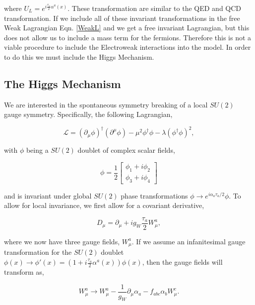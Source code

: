 where $U_L=e^{i\frac{\tau_a}{2}\alpha^a(x)}$. These transformation are similar to the QED and QCD transformation. If we include all of these invariant transformations in the free Weak Lagrangian Eqn. \ref{WeakL} and we get a free invariant Lagrangian, but this does not allow us to include a mass term for the fermions. Therefore this is not a viable procedure to include the Electroweak interactions into the model. In order to do this we must include the Higgs Mechanism.

\subsection{The Higgs Mechanism}\label{HiggsMechanism}

We are interested in the spontaneous symmetry breaking of a local $SU(2)$ gauge symmetry. Specifically, the following Lagrangian,

\begin{equation}\label{HiggsLagrangian}
\mathcal{L}=(\partial_\mu\phi)^\dagger(\partial^\mu\phi)-\mu^2\phi^\dagger\phi-\lambda(\phi^\dagger\phi)^2,
\end{equation}

with $\phi$ being a $SU(2)$ doublet of complex scalar fields,

\begin{equation}
\phi=\frac{1}{2}
\begin{bmatrix}
\phi_1+i\phi_2 \\
\phi_3+i\phi_4
\end{bmatrix}
\end{equation} 

and is invariant under global $SU(2)$ phase transformations $\phi\rightarrow e^{i\alpha_a\tau_a/2}\phi$. To allow for local invariance, we first allow for a covariant derivative,

\begin{equation}
D_\mu=\partial_\mu+ig_W \frac{\tau_a}{2}W_\mu^a,
\end{equation}

where we now have three gauge fields, $W_\mu^a$. If we assume an infanitesimal gauge transformation for the $SU(2)$ doublet $\phi(x)\rightarrow\phi'(x)=(1 +i\frac{\tau_a}{2}\alpha^a(x))\phi(x)$, then the gauge fields will transform as,

\begin{equation}\label{HiggVectorTransform}
W^a_\mu\rightarrow W^a_\mu-\frac{1}{g_W}\partial_\mu\alpha_a-f_{abc}\alpha_bW^c_\mu.
\end{equation}


